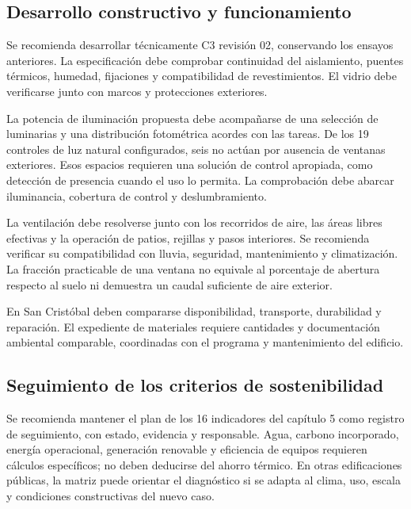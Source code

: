\subsection{Desarrollo constructivo y funcionamiento}
\begin{textoDosTercios}
Se recomienda desarrollar técnicamente C3 revisión 02, conservando los ensayos anteriores. La especificación debe comprobar continuidad del aislamiento, puentes térmicos, humedad, fijaciones y compatibilidad de revestimientos. El vidrio debe verificarse junto con marcos y protecciones exteriores.

La potencia de iluminación propuesta debe acompañarse de una selección de luminarias y una distribución fotométrica acordes con las tareas. De los 19 controles de luz natural configurados, seis no actúan por ausencia de ventanas exteriores. Esos espacios requieren una solución de control apropiada, como detección de presencia cuando el uso lo permita. La comprobación debe abarcar iluminancia, cobertura de control y deslumbramiento.

La ventilación debe resolverse junto con los recorridos de aire, las áreas libres efectivas y la operación de patios, rejillas y pasos interiores. Se recomienda verificar su compatibilidad con lluvia, seguridad, mantenimiento y climatización. La fracción practicable de una ventana no equivale al porcentaje de abertura respecto al suelo ni demuestra un caudal suficiente de aire exterior.

En San Cristóbal deben compararse disponibilidad, transporte, durabilidad y reparación. El expediente de materiales requiere cantidades y documentación ambiental comparable, coordinadas con el programa y mantenimiento del edificio.
\end{textoDosTercios}

\subsection{Seguimiento de los criterios de sostenibilidad}
\begin{textoDosTercios}
Se recomienda mantener el plan de los 16 indicadores del capítulo 5 como registro de seguimiento, con estado, evidencia y responsable. Agua, carbono incorporado, energía operacional, generación renovable y eficiencia de equipos requieren cálculos específicos; no deben deducirse del ahorro térmico. En otras edificaciones públicas, la matriz puede orientar el diagnóstico si se adapta al clima, uso, escala y condiciones constructivas del nuevo caso.
\end{textoDosTercios}

